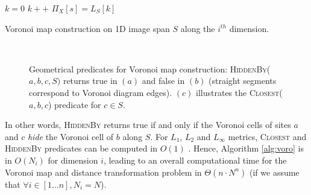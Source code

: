 \documentclass{llncs}
\begin{document}
\begin{algorithm}[H]\footnotesize
{ $k=0$\;
}
  {
          {
            $k++$\;
          }
    $\Pi_X[s] = L_S[k]$\;
  }

  \caption{Voronoi map construction on 1D image span $S$ along the
    $i^{th}$ dimension.\label{alg:voro}}
\end{algorithm}
\begin{figure}
  \begin{center}
    ~~~~~~~~~~
  \end{center}
  \caption{\small Geometrical predicates for Voronoi map construction:
    \textsc{HiddenBy}($a,b,c,S)$ returns true in $(a)$ and false in
    $(b)$ (straight segments correspond to Voronoi diagram
    edges). $(c)$ illustrates the \textsc{Closest}($a,b,c$) predicate
    for $c\in S$.}
  \label{fig:predicates}
\end{figure}


In other words, \textsc{HiddenBy} returns true if and only if the
Voronoi cells of sites $a$ and $c$ \emph{hide} the Voronoi cell of $b$
along $S$.  For $L_1$, $L_2$ and $L_\infty$ metrics,
\textsc{Closest} and \textsc{HiddenBy} predicates can be computed in
$O(1)$ \cite{BreuEtAl95,Hirata,roerdnik}. Hence, Algorithm
\ref{alg:voro} is in $O(N_i)$ for dimension $i$, leading to an overall
computational time for the Voronoi map and distance transformation
problem in $\Theta(n\cdot N^n)$ (if we assume that $\forall i\in[1\ldots
  n], N_i=N$).
\end{document}
